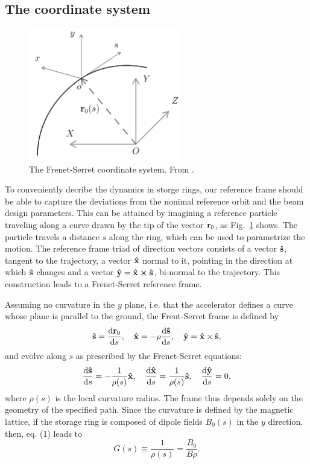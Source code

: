 \subsection{The coordinate system}
\begin{figure}[htb]
    \centering
    \includegraphics[width=0.6\textwidth]{Images/frenetserret.png}
    \caption{The Frenet-Serret coordinate system. From \cite{huang2019beam}.}
    \label{frenetserret}
\end{figure}
To conveniently decribe the dynamics in storge rings, our reference frame should be able to capture the deviations from the nonimal reference orbit and the beam design parameters. This can be attained by imagining a reference particle traveling along a curve drawn by the tip of the vector $\vb{r}_0$, as Fig.~\ref{frenetserret} shows. The particle travels a distance $s$ along the ring, which can be used to parametrize the motion. The reference frame triad of direction vectors consists of a vector $\vu{s}$, tangent to the trajectory, a vector $\vu{x}$ normal to it, pointing in the direction at which $\vu{s}$ changes and a vector $\vu{y}=\vu{x}\cross\vu{s}$, bi-normal to the trajectory. This construction leads to a Frenet-Serret reference frame.

Assuming no curvature in the $y$ plane, i.e. that the accelerator defines a curve whose plane is parallel to the ground, the Frent-Serret frame is defined by \cite{lee}
\begin{equation}
\vu{s}=\dv{\vb{r}_{0}}{s}, \quad \vu{x}=-\rho\dv{\vu{s}}{s}, \quad \vu{y} =  \vu{x}\times\vu{s},
\end{equation}
    and evolve along $s$ as prescribed by the Frenet-Serret equations:
\begin{equation}
\dv{\vu{s}}{s}=-\frac{1}{\rho(s)}\vu{x}, \quad\dv{\vu{x}}{s}=\frac{1}{\rho(s)}\vu{s}, \quad \dv{\vu{y}}{s}=0,
\end{equation}
where $\rho(s)$ is the local curvature radius. The frame thus depends solely on the geometry of the specified path. Since the curvature is defined by the magnetic lattice, if the storage ring is composed of dipole fields $B_0(s)$ in the $y$ direction, then, eq. (1) leads to
    \begin{equation}
        G(s) \equiv \frac{1}{\rho(s)} = \frac{B_0}{B\rho}.
        \label{G}
    \end{equation}

